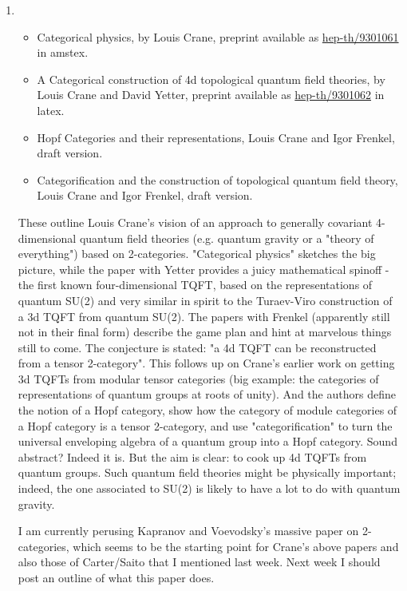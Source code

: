 \begin{enumerate}
\item \begin{itemize}
    \item Categorical physics, by Louis Crane, preprint available as \href{https://arxiv.org/abs/hep-th/9301061}{hep-th/9301061} in amstex.

    \item A Categorical construction of 4d topological quantum field theories, by Louis Crane and David Yetter, preprint available as \href{https://arxiv.org/abs/hep-th/9301062}{hep-th/9301062} in latex.

    \item Hopf Categories and their representations, Louis Crane and Igor Frenkel, draft version.

    \item Categorification and the construction of topological quantum field theory, Louis Crane and Igor Frenkel, draft version.
\end{itemize}

These outline Louis Crane's vision of an approach to generally covariant 4-dimensional quantum field theories (e.g. quantum gravity or a "theory of everything") based on 2-categories. "Categorical physics" sketches the big picture, while the paper with Yetter provides a juicy mathematical spinoff - the first known four-dimensional TQFT, based on the representations of quantum SU(2) and very similar in spirit to the Turaev-Viro construction of a 3d TQFT from quantum SU(2). The papers with Frenkel (apparently still not in their final form) describe the game plan and hint at marvelous things still to come. The conjecture is stated: "a 4d TQFT can be reconstructed from a tensor 2-category". This follows up on Crane's earlier work on getting 3d TQFTs from modular tensor categories (big example: the categories of representations of quantum groups at roots of unity). And the authors define the notion of a Hopf category, show how the category of module categories of a Hopf category is a tensor 2-category, and use "categorification" to turn the universal enveloping algebra of a quantum group into a Hopf category. Sound abstract? Indeed it is. But the aim is clear: to cook up 4d TQFTs from quantum groups. Such quantum field theories might be physically important; indeed, the one associated to SU(2) is likely to have a lot to do with quantum gravity.

I am currently perusing Kapranov and Voevodsky's massive paper on 2-categories, which seems to be the starting point for Crane's above papers and also those of Carter/Saito that I mentioned last week. Next week I should post an outline of what this paper does.


\end{enumerate}
